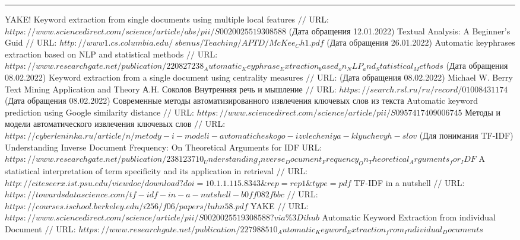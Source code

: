 \makeatletter \renewcommand{} \makeatother
\renewcommand\refname{Список использованных источников}
\begin{thebibliography}{00}
	\hrule	
	
	YAKE! Keyword extraction from single documents using multiple local features $//$ URL: $https://www.sciencedirect.com/science/article/abs/pii/S0020025519308588$ (Дата обращения 12.01.2022)
	Textual Analysis: A Beginner's Guid  $//$ URL: $http://www1.cs.columbia.edu/~sbenus/Teaching/APTD/McKee_Ch1.pdf$ (Дата обращения 26.01.2022)
	Automatic keyphrases extraction based on NLP  and statistical methods $//$ URL: $https://www.researchgate.net/publication/220827238_Automatic_Keyphrase_Extraction_based_on_NLP_and_Statistical_Methods$ (Дата обращения 08.02.2022)
	Keyword extraction from a single document using centrality measures $//$ URL:  (Дата обращения 08.02.2022)
	Michael W. Berry Text Mining Application and Theory
	А.Н. Соколов Внутренняя речь и мышление $//$ URL: $https://search.rsl.ru/ru/record/01008431174$ (Дата обращения 08.02.2022)
	Современные методы автоматизированного извлечения ключевых слов из текста
	Automatic keyword prediction using Google similarity distance $//$ URL: $https://www.sciencedirect.com/science/article/pii/S0957417409006745$
	Методы и модели автоматического извлечения ключевых слов $//$ URL: $https://cyberleninka.ru/article/n/metody-i-modeli-avtomaticheskogo-izvlecheniya-klyuchevyh-slov$
	(Для понимания TF-IDF) Understanding Inverse Document Frequency: On Theoretical Arguments for IDF URL: $https://www.researchgate.net/publication/238123710_Understanding_Inverse_Document_Frequency_On_Theoretical_Arguments_for_IDF$
	A statistical interpretation of term specificity and its application in retrieval $//$ URL: $http://citeseerx.ist.psu.edu/viewdoc/download?doi=10.1.1.115.8343\&rep=rep1\&type=pdf$
	TF-IDF in a nutshell $//$ URL: $https://towardsdatascience.com/tf-idf-in-a-nutshell-b0ff082fbbc$
	 $//$ URL: $https://courses.ischool.berkeley.edu/i256/f06/papers/luhn58.pdf$
	YAKE $//$ URL: $https://www.sciencedirect.com/science/article/pii/S0020025519308588?via\%3Dihub$
	Automatic Keyword Extraction from individual Document
	$//$ URL: $https://www.researchgate.net/publication/227988510_Automatic_Keyword_Extraction_from_Individual_Documents$
\end{thebibliography}
